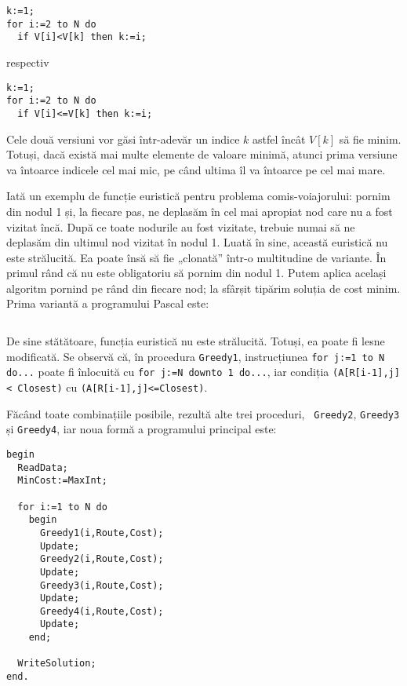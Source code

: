 \begin{itemize}
\begin{verbatim}
k:=1;
for i:=2 to N do
  if V[i]<V[k] then k:=i;
\end{verbatim}

respectiv

\begin{verbatim}
k:=1;
for i:=2 to N do
  if V[i]<=V[k] then k:=i;
\end{verbatim}

Cele două versiuni vor găsi într-adevăr un indice $k$ astfel încât $V[k]$ să
fie minim. Totuși, dacă există mai multe elemente de valoare minimă, atunci
prima versiune va întoarce indicele cel mai mic, pe când ultima îl va întoarce
pe cel mai mare.

\end{itemize}

Iată un exemplu de funcție euristică pentru problema comis-voiajorului: pornim
din nodul 1 și, la fiecare pas, ne deplasăm în cel mai apropiat nod care nu a
fost vizitat încă. După ce toate nodurile au fost vizitate, trebuie numai să
ne deplasăm din ultimul nod vizitat în nodul 1. Luată în sine, această
euristică nu este strălucită. Ea poate însă să fie „clonată” într-o
multitudine de variante. În primul rând că nu este obligatoriu să pornim din
nodul 1. Putem aplica același algoritm pornind pe rând din fiecare nod; la
sfârșit tipărim soluția de cost minim. Prima variantă a programului Pascal
este:

\inputminted{pascal}{src/chapter5-4.pas}

De sine stătătoare, funcția euristică nu este strălucită. Totuși, ea poate fi
lesne modificată. Se observă că, în procedura {\tt Greedy1}, instrucțiunea
\texttt{for j:=1 to N do...} poate fi înlocuită cu
\texttt{for j:=N downto 1 do...}, iar condiția
\texttt{(A[R[i-1],j] < Closest)} cu
\texttt{(A[R[i-1],j]<=Closest)}.

Făcând toate combinațiile posibile, rezultă alte trei proceduri, {\tt
  Greedy2}, {\tt Greedy3} și {\tt Greedy4}, iar noua formă a programului
principal este:

\begin{verbatim}
begin
  ReadData;
  MinCost:=MaxInt;

  for i:=1 to N do
    begin
      Greedy1(i,Route,Cost);
      Update;
      Greedy2(i,Route,Cost);
      Update;
      Greedy3(i,Route,Cost);
      Update;
      Greedy4(i,Route,Cost);
      Update;
    end;

  WriteSolution;
end.
\end{verbatim}

